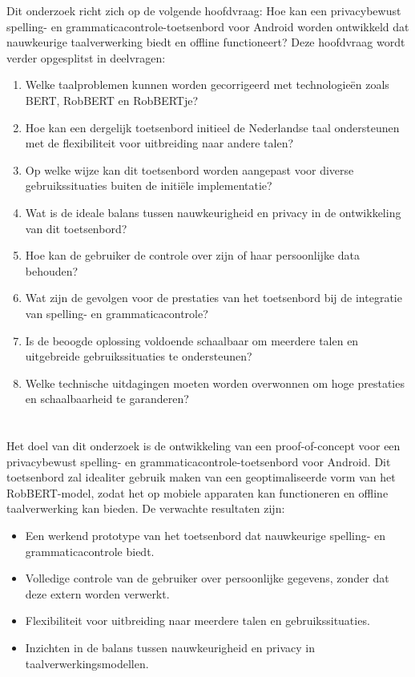 Dit onderzoek richt zich op de volgende hoofdvraag: Hoe kan een privacybewust spelling- en grammaticacontrole-toetsenbord voor Android worden ontwikkeld dat nauwkeurige taalverwerking biedt en offline functioneert? Deze hoofdvraag wordt verder opgesplitst in deelvragen:
\begin{enumerate}
    \item Welke taalproblemen kunnen worden gecorrigeerd met technologieën zoals BERT, RobBERT en RobBERTje?
    \item Hoe kan een dergelijk toetsenbord initieel de Nederlandse taal ondersteunen met de flexibiliteit voor uitbreiding naar andere talen?
    \item Op welke wijze kan dit toetsenbord worden aangepast voor diverse gebruikssituaties buiten de initiële implementatie?
    \item Wat is de ideale balans tussen nauwkeurigheid en privacy in de ontwikkeling van dit toetsenbord?
    \item Hoe kan de gebruiker de controle over zijn of haar persoonlijke data behouden?
    \item Wat zijn de gevolgen voor de prestaties van het toetsenbord bij de integratie van spelling- en grammaticacontrole?
    \item Is de beoogde oplossing voldoende schaalbaar om meerdere talen en uitgebreide gebruikssituaties te ondersteunen?
    \item Welke technische uitdagingen moeten worden overwonnen om hoge prestaties en schaalbaarheid te garanderen?
\end{enumerate}

\section{}%
\label{sec:onderzoeksdoelstelling}

Het doel van dit onderzoek is de ontwikkeling van een proof-of-concept voor een privacybewust spelling- en grammaticacontrole-toetsenbord voor Android. Dit toetsenbord zal idealiter gebruik maken van een geoptimaliseerde vorm van het Rob\-BERT-model, zodat het op mobiele apparaten kan functioneren en offline taalverwerking kan bieden. De verwachte resultaten zijn:
\begin{itemize}
    \item Een werkend prototype van het toetsenbord dat nauwkeurige spelling- en grammaticacontrole biedt.
    \item Volledige controle van de gebruiker over persoonlijke gegevens, zonder dat deze extern worden verwerkt.
    \item Flexibiliteit voor uitbreiding naar meerdere talen en gebruikssituaties.
    \item Inzichten in de balans tussen nauwkeurigheid en privacy in taalverwerkingsmodellen.
\end{itemize}

